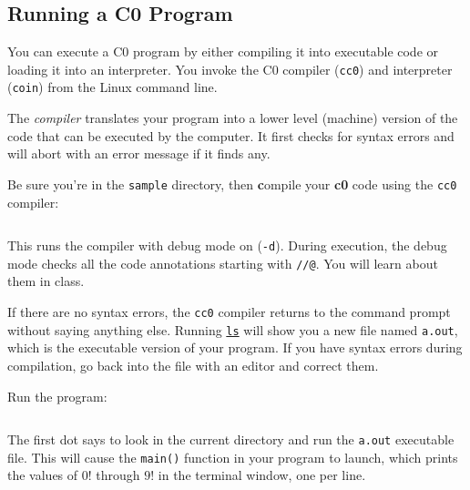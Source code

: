 \subsection*{Running a C0 Program}

You can execute a C0 program by either compiling it into executable
code or loading it into an interpreter. You invoke the C0 compiler
(\lstinline[language={[coin]C}]'cc0') and interpreter
(\lstinline[language={[coin]C}]'coin') from the Linux command line.

The \emph{compiler} translates your program into a lower level
(machine) version of the code that can be executed by the computer.
It first checks for syntax errors and will abort with an error message
if it finds any.

\begin{part}
  Be sure you're in the \lstinline'sample' directory, then 
  \textbf{\color{red}c}ompile your \textbf{\color{red}c0} code using the
  \lstinline[language={[coin]C}]'cc0' compiler:
\begin{lstlisting}[language={[coin]C}, belowskip=0ex]
   % cc0 -d factorial.c0
\end{lstlisting}
This runs the compiler with debug mode on
(\lstinline[language={[coin]C}]'-d').  During execution, the debug
mode checks all the code annotations starting with \lstinline'//@'.
You will learn about them in class.
\end{part}
\vspace{-1ex}

If there are no syntax errors, the \lstinline[language={[coin]C}]'cc0'
compiler returns to the command prompt without saying anything else.
Running \underline{\lstinline[language={[coin]C}]'ls'} will show you a
new file named \lstinline[language={[coin]C}]'a.out', which is the
executable version of your program. If you have syntax errors during
compilation, go back into the file with an editor and correct them.

\begin{part}
  Run the program:
\begin{lstlisting}[language={[coin]C}, belowskip=0ex]
  % ./a.out
\end{lstlisting}
The first dot says to look in the current directory and run the
\lstinline[language={[coin]C}]'a.out' executable file. This will cause
the \lstinline'main()' function in your program to launch, which
prints the values of $0!$ through $9!$ in the terminal window, one per
line.
\end{part}
\vspace{-1ex}

